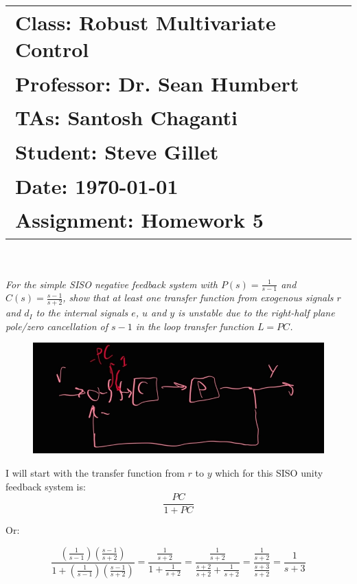 \documentclass{article}
\begin{document}
\title{
    \begin{tabular}{@{}l@{}}
        \textbf{Class:} Robust Multivariate Control \\
        \textbf{Professor:} Dr. Sean Humbert \\
        \textbf{TAs:} Santosh Chaganti \\
        \textbf{Student:} Steve Gillet \\
        \textbf{Date:} \today \\
        \textbf{Assignment:} Homework 5
    \end{tabular}
}

\author{}
\date{}

\maketitle

\section{}

\textit{For the simple SISO negative feedback system with \(P(s) = \frac{1}{s-1}\) and \(C(s) = \frac{s-1}{s+2}\), show that at least one transfer function from exogenous signals \(r\) and \(d_I\) to the internal signals \(e\), \(u\) and \(y\) is unstable due to the right-half plane pole/zero cancellation of \(s - 1\) in the loop transfer function \(L = PC\).}

\begin{figure}[H]
    \centering
    \includegraphics[width=\textwidth]{p1ryDiagram.jpg}
\end{figure}

I will start with the transfer function from \(r\) to \(y\) which for this SISO unity feedback system is:
\[
\frac{PC}{1 + PC}
\]

Or:

\[
\frac{(\frac{1}{s-1})(\frac{s-1}{s+2})}{1 + (\frac{1}{s-1})(\frac{s-1}{s+2})} = \frac{\frac{1}{s+2}}{1+\frac{1}{s+2}} = \frac{\frac{1}{s+2}}{\frac{s+2}{s+2}+\frac{1}{s+2}} = \frac{\frac{1}{s+2}}{\frac{s+3}{s+2}} = \frac{1}{s+3}
\]
\end{document}
